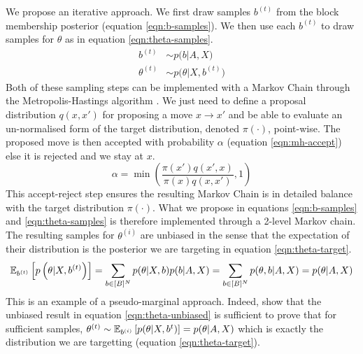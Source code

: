 We propose an iterative approach. We first draw samples $b^{(t)}$ from the block membership posterior (equation \ref{eqn:b-samples}). We then use each $b^{(t)}$ to draw samples for $\theta$ as in equation \ref{eqn:theta-samples}. 
%
\begin{align}
	b^{(t)} &\sim p \Big( b | A, X \Big)  \label{eqn:b-samples}\\
	\theta^{(t)} &\sim p\Big(\theta | X, b^{(t)} \Big) \label{eqn:theta-samples}
\end{align}
%
Both of these sampling steps can be implemented with a Markov Chain through the Metropolis-Hastings algorithm \cite{hastings-alg}. We just need to define a proposal distribution $q(x, x')$ for proposing a move $x \rightarrow x'$ and be able to evaluate an un-normalised form of the target distribution, denoted $\pi(\cdot)$, point-wise. The proposed move is then accepted with probability $\alpha$ (equation \ref{eqn:mh-accept}) else it is rejected and we stay at $x$.
%
\begin{equation}
	\alpha = \min \left( \frac{\pi(x') q(x', x)}{\pi(x) q(x, x')} , 1 \right)
	\label{eqn:mh-accept}
\end{equation}
%
This accept-reject step ensures the resulting Markov Chain is in detailed balance with the target distribution $\pi(\cdot)$. What we propose in equations \ref{eqn:b-samples} and \ref{eqn:theta-samples} is therefore implemented through a 2-level Markov chain. The resulting samples for $\theta^{(i)}$ are unbiased in the sense that the expectation of their distribution is the posterior we are targeting in equation \ref{eqn:theta-target}.
%
\begin{equation}
\mathbb{E}_{b^{(t)}} \left[p \left( \theta | X, b^{(t)} \right) \right] = \sum_{b \in [B]^N} p(\theta | X, b) p(b | A, X) = \sum_{b \in [B]^N} p(\theta, b | A, X) = p(\theta | A, X)
\label{eqn:theta-unbiased}
\end{equation}
%
This is an example of a pseudo-marginal approach. Indeed, \citet{pseudo-marginal} show that the unbiased result in equation \ref{eqn:theta-unbiased} is sufficient to prove that for sufficient samples, $\theta^{(t)} \sim \mathbb{E}_{b^{(i)}} \left[ p(\theta | X, b^{t})\right] = p(\theta 
| A, X)$ which is exactly the distribution we are targetting (equation \ref{eqn:theta-target}).

